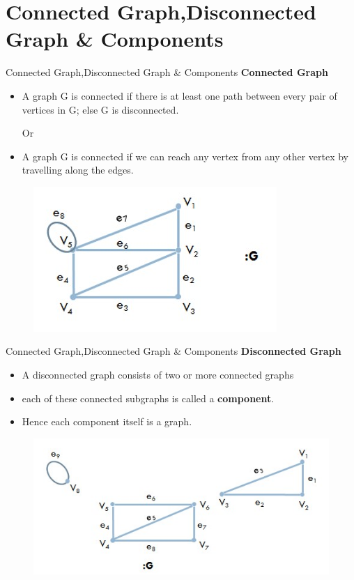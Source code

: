 \documentclass{beamer}
\begin{document}
\section{Connected Graph,Disconnected Graph \& Components}
\begin{frame}{Connected Graph,Disconnected Graph \& Components}
	\textbf{Connected Graph}
		\begin{itemize}
			\item A graph G is connected if there is at least one path between every pair of vertices in G; else G is disconnected.
			\begin{center}
				Or 
			\end{center}
			\item A graph G is connected if we can reach any vertex from any other vertex
			by travelling along the edges.
		\end{itemize}
		\begin{figure}
		\includegraphics[scale=.6]{img/m35}
	\end{figure}
\end{frame}
\begin{frame}{Connected Graph,Disconnected Graph \& Components}
	\textbf{Disconnected Graph}
	\begin{itemize}
		\item A  disconnected graph consists of two or more connected graphs 
		\item each of these connected subgraphs is called a \textbf{component}.
		\item Hence each component itself is a graph.
	\end{itemize}
	\begin{figure}
		\includegraphics[scale=.6]{img/m36}
	\end{figure}
\end{frame}
\end{document}
